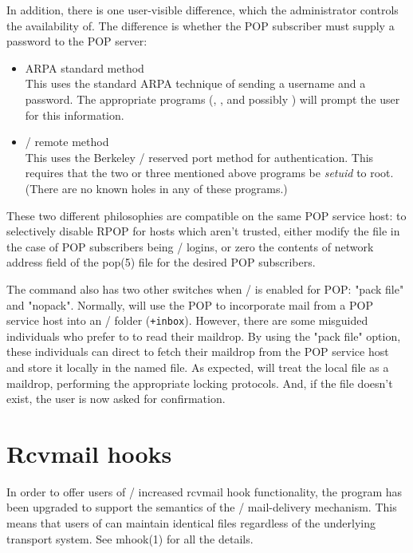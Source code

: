 In addition, there is one user-visible difference,
which the administrator controls the availability of.
The difference is whether the POP subscriber must supply a password to the POP
server:
\begin{itemize}
\item	ARPA standard method\\
This uses the standard ARPA technique of sending a username and a password.
The appropriate programs (, , and possibly )
will prompt the user for this information.

\item	\unix/ remote method\\
This uses the Berkeley \unix/ reserved port method for authentication.
This requires that the two or three mentioned above programs be {\em setuid\/}
to root.
(There are no known holes in any of these programs.)
\end{itemize}
These two different philosophies are compatible on the same POP service host:
to selectively disable RPOP for hosts which aren't trusted,
either modify the  file in the case of POP subscribers being
\unix/ logins,
or zero the contents of network address field of the \man pop(5) file for the
desired POP subscribers.

The  command also has two other switches when \MH/ is enabled for
POP:
\switch"pack file" and \switch"nopack".
Normally,
 will use the POP to incorporate mail from a POP service host into
an \MH/ folder (\verb"+inbox").
However,
there are some misguided individuals who prefer to  to read their
maildrop.
By using the \switch"pack file" option,
these individuals can direct  to fetch their maildrop from the POP
service host and store it locally in the named file.
As expected,  will treat the local file as a maildrop,
performing the appropriate locking protocols.
And,
if the file doesn't exist,
the user is now asked for confirmation.

\section*	{Rcvmail hooks}
In order to offer users of \MH/ increased rcvmail hook functionality,
the  program has been upgraded to support the semantics of
the \MMDFII/ mail-delivery mechanism.
This means that users of  can maintain identical 
files regardless of the underlying transport system.
See \man mhook(1) for all the details.

